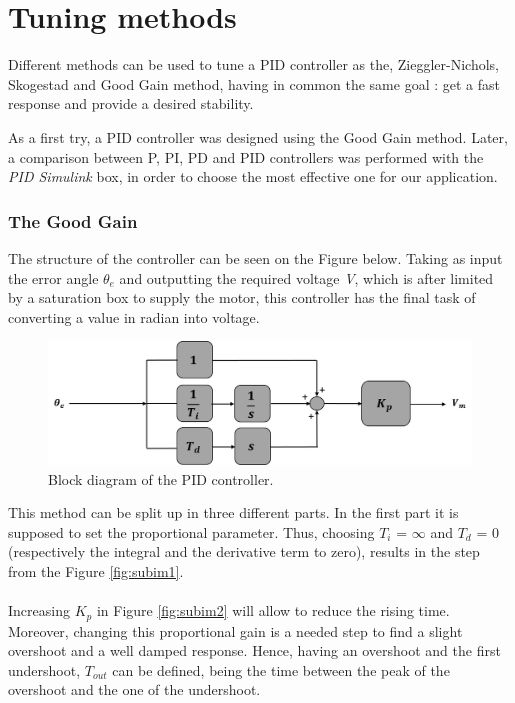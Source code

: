 \section{Tuning methods}
Different methods can be used to tune a PID controller as the, Zieggler-Nichols, Skogestad and Good Gain method, having in common the same goal : get a fast response and provide a desired stability.\par
As a first try, a PID controller was designed using the Good Gain method. Later, a comparison between P, PI, PD and PID controllers was performed with the \emph{PID Simulink} box, in order to choose the most effective one for our application.\par 	

\subsubsection{The Good Gain}


The structure of the controller can be seen on the Figure below. Taking as input the error angle \textbf{$\theta_{e}$} and outputting the required voltage \textit{V}, which is after limited by a saturation box to supply the motor, this controller has the final task of converting a value in radian into voltage.\par

\begin{figure}[H]
  \centering
  \includegraphics[scale=0.5]{figures/controller_model.png}
  \caption[LABEL] {Block diagram of the PID controller.}
\end{figure}
  
This method can be split up in three different parts. In the first part it is supposed to set the proportional parameter. Thus, choosing $T_i$ = $\infty$ and $T_d$ = 0 (respectively the integral and the derivative term to zero), results in the step from the Figure \ref{fig:subim1}.

\paragraph{}Increasing $K_p$ in Figure \ref{fig:subim2} will allow to reduce the rising time. Moreover, changing this proportional gain is a needed step to find a slight overshoot and a well damped response. Hence, having an overshoot and the first undershoot, $T_{out}$ can be defined, being the time between the peak of the overshoot and the one of the undershoot.
